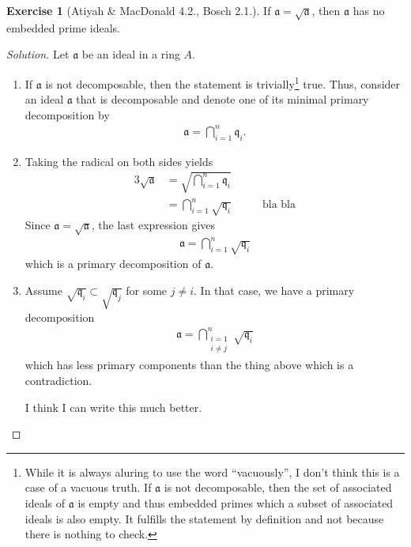\documentclass[a4paper]{book}
\theoremstyle{definition}
\newtheorem{exercise}{Exercise}[definition]
\begin{document}
\begin{exercise}[Atiyah \& MacDonald 4.2., Bosch 2.1.]
    If \(\mathfrak{a} = \sqrt{\mathfrak{a}}\), then \(\mathfrak{a}\) has no embedded prime ideals.
\end{exercise}
\begin{proof}[Solution]
    Let \(\mathfrak{a}\) be an ideal in a ring \(A\).
    \begin{enumerate}
        \item If \(\mathfrak{a}\) is not decomposable, then the statement is trivially\footnote{While it is always aluring to use the word ``vacuously'', I don't think this is a case of a vacuous truth. If \(\mathfrak{a}\) is not decomposable, then the set of associated ideals of \(\mathfrak{a}\) is empty and thus embedded primes which a subset of associated ideals is also empty. It fulfills the statement by definition and not because there is nothing to check.} true. Thus, consider an ideal \(\mathfrak{a}\) that is decomposable and denote one of its minimal primary decomposition by
        \begin{align*}
            \mathfrak{a} = \bigcap_{i = 1}^n \mathfrak{q}_i \text{.}
        \end{align*}
        \item Taking the radical on both sides yields
        \begin{alignat*}{3}
            \sqrt{\mathfrak{a}} &= \sqrt{\bigcap_{i = 1}^n \mathfrak{q}_i} \\
            &= \bigcap_{i = 1}^n \sqrt{\mathfrak{q}_i} & \qquad \text{bla bla}
        \end{alignat*}
        Since \(\mathfrak{a} = \sqrt{\mathfrak{a}}\), the last expression gives
        \begin{align*}
            \mathfrak{a} = \bigcap_{i=1}^n \sqrt{\mathfrak{q}_i}
        \end{align*}
        which is a primary decomposition of \(\mathfrak{a}\).
        \item Assume \(\sqrt{\mathfrak{q}_i} \subset \sqrt{\mathfrak{q}_j}\) for some \(j \neq i\). In that case, we have a primary decomposition
        \begin{align*}
            \mathfrak{a} = \bigcap_{\substack{i = 1 \\ i \neq j}}^n \sqrt{\mathfrak{q}_i}
        \end{align*}
        which has less primary components than the thing above which is a contradiction.

        I think I can write this much better.
    \end{enumerate}
\end{proof}
\end{document}
